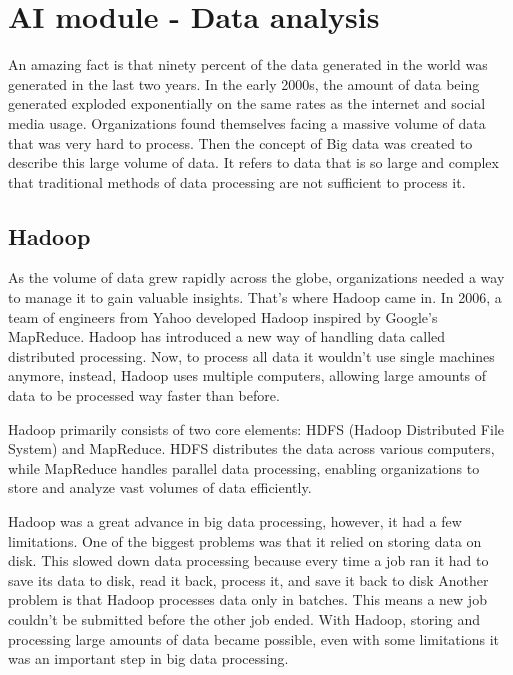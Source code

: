 \section{AI module - Data analysis}
An amazing fact is that ninety percent of the data generated in the world was generated in the last two years. In the early 2000s, the amount of data being
generated exploded exponentially on the same rates as the internet and social media usage. Organizations found themselves facing a massive volume of data 
that was very hard to process. Then the concept of Big data was created to describe this large volume of data. It refers to data that is so large and complex
that traditional methods of data processing are not sufficient to process it. \cite{bigdata}

\subsection{Hadoop}
As the volume of data grew rapidly across the globe, organizations needed a way to manage it to gain valuable insights. That’s where Hadoop came in. In 2006, a team of engineers from Yahoo developed Hadoop inspired by Google’s MapReduce. Hadoop has introduced a new way of handling data called distributed processing. Now, to process all data it wouldn't use single machines anymore, instead, Hadoop uses multiple computers, allowing large amounts of data to be processed way faster than before.

Hadoop primarily consists of two core elements: HDFS (Hadoop Distributed File System) and MapReduce. HDFS distributes the data across various computers, while MapReduce handles parallel data processing, enabling organizations to store and analyze vast volumes of data efficiently.

Hadoop was a great advance in big data processing, however, it had a few limitations. One of the biggest problems was that it relied on storing data on disk. This slowed down data processing because every time a job ran it had to save its data to disk, read it back, process it, and save it back to disk Another problem is that Hadoop processes data only in batches. This means a new job couldn't be submitted before the other job ended.
With Hadoop, storing and processing large amounts of data became possible, even with some limitations it was an important step in big data processing.\cite{hadoop}


